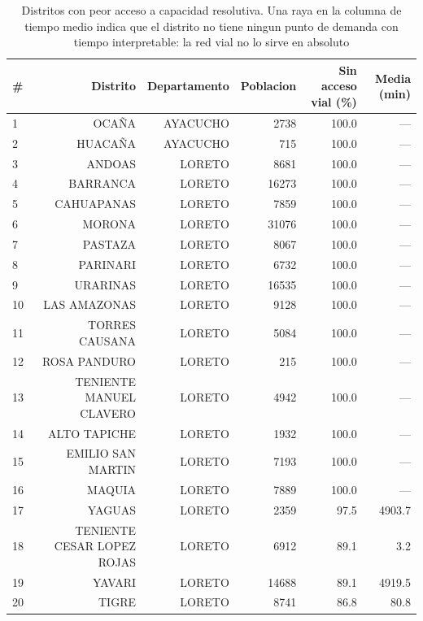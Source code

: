 \begin{table}[htbp]
\caption{Distritos con peor acceso a capacidad resolutiva. Una raya en la columna de tiempo medio indica que el distrito no tiene ningun punto de demanda con tiempo interpretable: la red vial no lo sirve en absoluto}
\label{tab:brechas}
\begin{tabular}{lrrrrr}
\toprule
\# & Distrito & Departamento & Poblacion & Sin acceso vial (\%) & Media (min) \\
\midrule
1 & OCAÑA & AYACUCHO & 2738 & 100.0 & --- \\
2 & HUACAÑA & AYACUCHO & 715 & 100.0 & --- \\
3 & ANDOAS & LORETO & 8681 & 100.0 & --- \\
4 & BARRANCA & LORETO & 16273 & 100.0 & --- \\
5 & CAHUAPANAS & LORETO & 7859 & 100.0 & --- \\
6 & MORONA & LORETO & 31076 & 100.0 & --- \\
7 & PASTAZA & LORETO & 8067 & 100.0 & --- \\
8 & PARINARI & LORETO & 6732 & 100.0 & --- \\
9 & URARINAS & LORETO & 16535 & 100.0 & --- \\
10 & LAS AMAZONAS & LORETO & 9128 & 100.0 & --- \\
11 & TORRES CAUSANA & LORETO & 5084 & 100.0 & --- \\
12 & ROSA PANDURO & LORETO & 215 & 100.0 & --- \\
13 & TENIENTE MANUEL CLAVERO & LORETO & 4942 & 100.0 & --- \\
14 & ALTO TAPICHE & LORETO & 1932 & 100.0 & --- \\
15 & EMILIO SAN MARTIN & LORETO & 7193 & 100.0 & --- \\
16 & MAQUIA & LORETO & 7889 & 100.0 & --- \\
17 & YAGUAS & LORETO & 2359 & 97.5 & 4903.7 \\
18 & TENIENTE CESAR LOPEZ ROJAS & LORETO & 6912 & 89.1 & 3.2 \\
19 & YAVARI & LORETO & 14688 & 89.1 & 4919.5 \\
20 & TIGRE & LORETO & 8741 & 86.8 & 80.8 \\
\bottomrule
\end{tabular}
\end{table}
